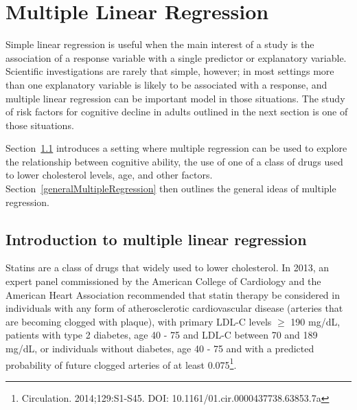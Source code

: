 
\chapter{Multiple Linear Regression}
\label{multipleLinearRegression}


Simple linear regression is useful when the main interest of a study is the association of a response variable with a single predictor or explanatory variable.  Scientific investigations are rarely that simple, however; in most settings more than one explanatory variable is likely to be associated with a response, and multiple linear regression can be important model in those situations.  The study of risk factors for cognitive decline in adults outlined in the next section is one of those situations.

Section~\ref{introductionMultipleLinearRegression} introduces a setting where multiple regression can be  used to explore the relationship between cognitive ability, the use of one of a class of drugs used to lower cholesterol levels, age, and other factors.   Section~\ref{generalMultipleRegression} then outlines the general ideas of multiple regression.  

\section{Introduction to multiple linear regression}
\label{introductionMultipleLinearRegression}

Statins are a class of drugs that widely used to lower cholesterol.  In 2013, an expert panel commissioned by the American College of Cardiology and the American Heart Association recommended that statin therapy be considered in individuals with any form of atherosclerotic cardiovascular disease (arteries that are becoming clogged with plaque), with primary LDL-C levels $\ge$ 190 mg/dL, patients with type 2 diabetes, age 40 - 75 and LDL-C between 70 and 189 mg/dL, or individuals without diabetes, age 40 - 75 and with a predicted probability of future clogged arteries of at least 0.075\footnote{Circulation. 2014;129:S1-S45. DOI: 10.1161/01.cir.0000437738.63853.7a}.

